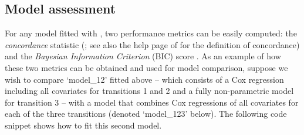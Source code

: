 \subsection{Model assessment}
\label{sec:model_assessment}
For any model fitted with , two performance metrics can be easily computed: the \textit{concordance} statistic (\citealp{harrell1982evaluating}; see also the help page of  for the definition of concordance) and the \textit{Bayesian Information Criterion} (BIC) score \citep{schwarz1978estimating}. As an example of how these two metrics can be obtained and used for model comparison, suppose we wish to compare `model\_12' fitted above -- which consists of a Cox regression including all covariates for transitions 1 and 2 and a fully non-parametric model for transition 3 -- with a model that combines Cox regressions of all covariates for each of the three transitions (denoted `model\_123' below).
The following code snippet shows how to fit this second model.

